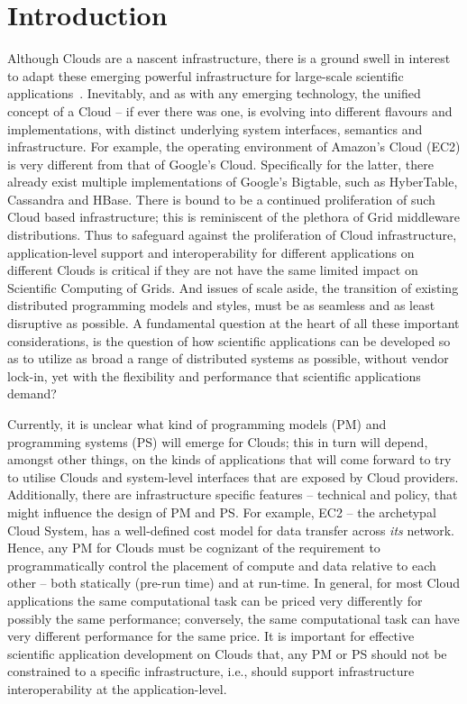 \documentclass[conference,final]{IEEEtran}
\begin{document}
\section{Introduction} 
Although Clouds are a nascent infrastructure, there is a ground swell
in interest to adapt these emerging powerful infrastructure for
large-scale scientific applications~\cite{montagecloud}. Inevitably,
and as with any emerging technology, the unified concept of a Cloud --
if ever there was one, is evolving into different flavours and
implementations, with distinct underlying system interfaces, semantics
and infrastructure. For example, the operating environment of Amazon's
Cloud (EC2) is very different from that of Google's
Cloud. Specifically for the latter, there already exist multiple
implementations of Google's Bigtable, such as HyberTable, Cassandra
and HBase. There is bound to be a continued proliferation of such
Cloud based infrastructure; this is reminiscent of the plethora of
Grid middleware distributions. Thus to safeguard against the
proliferation of Cloud infrastructure, application-level support and
interoperability for different applications on different Clouds is
critical if they are not have the same limited impact on Scientific
Computing of Grids. And issues of scale aside, the transition of
existing distributed programming models and styles, must be as
seamless and as least disruptive as possible.  A fundamental question
at the heart of all these important considerations, is the question of
how scientific applications can be developed so as to utilize as broad
a range of distributed systems as possible, without vendor lock-in,
yet with the flexibility and performance that scientific applications
demand?



Currently, it is unclear what kind of programming models (PM) and
programming systems (PS) will emerge for Clouds; this in turn will
depend, amongst other things, on the kinds of applications that will
come forward to try to utilise Clouds and system-level interfaces that
are exposed by Cloud providers.  Additionally, there are
infrastructure specific features -- technical and policy, that might
influence the design of PM and PS. For example, EC2 -- the archetypal
Cloud System, has a well-defined cost model for data transfer across
{\it its} network. Hence, any PM for Clouds must be cognizant of the
requirement to programmatically control the placement of compute and
data relative to each other -- both statically (pre-run time) and at
run-time.  In general, for most Cloud applications the same
computational task can be priced very differently for possibly the
same performance; conversely, the same computational task can have
very different performance for the same price. It is important for
effective scientific application development on Clouds that, any PM or
PS should not be constrained to a specific infrastructure, i.e.,
should support infrastructure interoperability at the
application-level.
\end{document}
